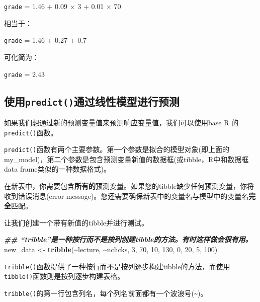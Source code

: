 \documentclass[
]{book}
\newenvironment{Shaded}{\begin{snugshade}}{\end{snugshade}}
\newcommand{\DecValTok}[1]{\textcolor[rgb]{0.00,0.00,0.81}{#1}}
\newcommand{\DocumentationTok}[1]{\textcolor[rgb]{0.56,0.35,0.01}{\textbf{\textit{#1}}}}
\newcommand{\FunctionTok}[1]{\textcolor[rgb]{0.13,0.29,0.53}{\textbf{#1}}}
\newcommand{\NormalTok}[1]{#1}
\newcommand{\OtherTok}[1]{\textcolor[rgb]{0.56,0.35,0.01}{#1}}
\newcommand{\SpecialCharTok}[1]{\textcolor[rgb]{0.81,0.36,0.00}{\textbf{#1}}}
\begin{document}
\texttt{grade} = 1.46 + 0.09 \(\times\) 3 + 0.01 \(\times\) 70

相当于：

\texttt{grade} = 1.46 + 0.27 + 0.7

可化简为：

\texttt{grade} = 2.43

\hypertarget{ux4f7fux7528predictux901aux8fc7ux7ebfux6027ux6a21ux578bux8fdbux884cux9884ux6d4b}{%
\subsection{\texorpdfstring{使用\texttt{predict()}通过线性模型进行预测}{使用predict()通过线性模型进行预测}}\label{ux4f7fux7528predictux901aux8fc7ux7ebfux6027ux6a21ux578bux8fdbux884cux9884ux6d4b}}

如果我们想通过新的预测变量值来预测响应变量值，我们可以使用base R 的\texttt{predict()}函数。

\texttt{predict()}函数有两个主要参数。第一个参数是拟合的模型对象(即上面的my\_model)，第二个参数是包含预测变量新值的数据框(或tibble，R中和数据框data frame类似的一种数据格式)。

在新表中，你需要包含\textbf{所有的}预测变量。如果您的tibble缺少任何预测变量，你将收到错误消息(error message)。您还需要确保新表中的变量名与模型中的变量名\textbf{完全}匹配。

让我们创建一个带有新值的tibble并进行测试。

\begin{Shaded}
\begin{Highlighting}[]
\DocumentationTok{\#\# “tribble”是一种按行而不是按列创建tibble的方法。有时这样做会很有用。}
\NormalTok{new\_data }\OtherTok{\textless{}{-}} \FunctionTok{tribble}\NormalTok{(}\SpecialCharTok{\textasciitilde{}}\NormalTok{lecture, }\SpecialCharTok{\textasciitilde{}}\NormalTok{nclicks,}
                    \DecValTok{3}\NormalTok{, }\DecValTok{70}\NormalTok{,}
                    \DecValTok{10}\NormalTok{, }\DecValTok{130}\NormalTok{,}
                    \DecValTok{0}\NormalTok{, }\DecValTok{20}\NormalTok{,}
                    \DecValTok{5}\NormalTok{, }\DecValTok{100}\NormalTok{)}
\end{Highlighting}
\end{Shaded}

\texttt{tribble()}函数提供了一种按行而不是按列逐步构建tibble的方法，而使用\texttt{tibble()}函数则是按列逐步构建表格。

\texttt{tribble()}的第一行包含列名，每个列名前面都有一个波浪号(\texttt{\textasciitilde{}})。
\end{document}
